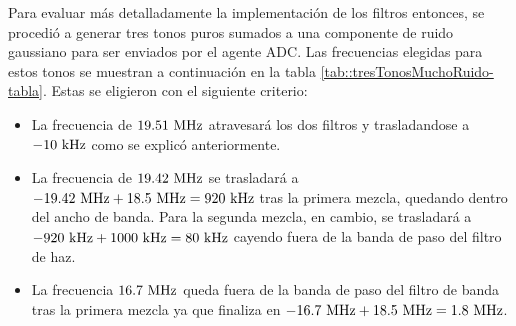 \documentclass[../../main.tex]{subfiles}
\begin{document}
Para evaluar más detalladamente la implementación de los filtros entonces, se procedió a generar tres tonos puros sumados a una componente de ruido gaussiano para ser enviados por el agente ADC. Las frecuencias elegidas para estos tonos se muestran a continuación en la tabla \ref{tab::tresTonosMuchoRuido-tabla}. Estas se eligieron con el siguiente criterio:
\begin{itemize}
    \item La frecuencia de $19.51~\textrm{MHz}$ atravesará los dos filtros y trasladandose a $-10~\textrm{kHz}$ como se explicó anteriormente.
    \item La frecuencia de $19.42~\textrm{MHz}$ se trasladará a $-19.42~\textrm{MHz} + 18.5~\textrm{MHz} = 920~\textrm{kHz}$ tras la primera mezcla, quedando dentro del ancho de banda. Para la segunda mezcla, en cambio, se trasladará a $-920~\textrm{kHz} + 1000~\textrm{kHz} = 80~\textrm{kHz}$ cayendo fuera de la banda de paso del filtro de haz.
    \item La frecuencia $16.7~\textrm{MHz}$ queda fuera de la banda de paso del filtro de banda tras la primera mezcla ya que finaliza en $-16.7~\textrm{MHz} + 18.5~\textrm{MHz} = 1.8~\textrm{MHz}$. 
\end{itemize}

\begin{table}[H]
    \centering
    \caption{Parámetros utilizados para la simulación de tres tonos con ruido.}\label{tab::tresTonosMuchoRuido-tabla}
    \end{table}
\end{document}
